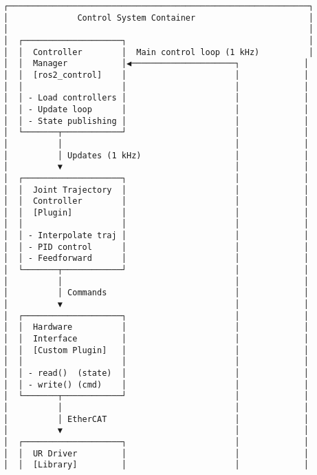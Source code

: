 \documentclass[
]{article}
\begin{document}
\begin{verbatim}
┌─────────────────────────────────────────────────────────────┐
│              Control System Container                       │
│                                                             │
│  ┌────────────────────┐                                     │
│  │  Controller        │  Main control loop (1 kHz)          │
│  │  Manager           │◀─────────────────────┐             │
│  │  [ros2_control]    │                      │             │
│  │                    │                      │             │
│  │ - Load controllers │                      │             │
│  │ - Update loop      │                      │             │
│  │ - State publishing │                      │             │
│  └───────┬────────────┘                      │             │
│          │                                   │             │
│          │ Updates (1 kHz)                   │             │
│          ▼                                   │             │
│  ┌────────────────────┐                      │             │
│  │  Joint Trajectory  │                      │             │
│  │  Controller        │                      │             │
│  │  [Plugin]          │                      │             │
│  │                    │                      │             │
│  │ - Interpolate traj │                      │             │
│  │ - PID control      │                      │             │
│  │ - Feedforward      │                      │             │
│  └───────┬────────────┘                      │             │
│          │                                   │             │
│          │ Commands                          │             │
│          ▼                                   │             │
│  ┌────────────────────┐                      │             │
│  │  Hardware          │                      │             │
│  │  Interface         │                      │             │
│  │  [Custom Plugin]   │                      │             │
│  │                    │                      │             │
│  │ - read()  (state)  │                      │             │
│  │ - write() (cmd)    │                      │             │
│  └───────┬────────────┘                      │             │
│          │                                   │             │
│          │ EtherCAT                          │             │
│          ▼                                   │             │
│  ┌────────────────────┐                      │             │
│  │  UR Driver         │                      │             │
│  │  [Library]         │                      │             │

\end{verbatim}
\end{document}
